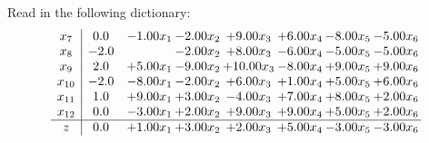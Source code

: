 \documentclass[9pt]{article}
\begin{document}
Read in the following dictionary:
\[\begin{array}{c| c c@{\hskip 2pt} c@{\hskip 2pt} c@{\hskip 2pt} c@{\hskip 2pt} c@{\hskip 2pt} c@{\hskip 2pt} }
 x_{7}   &  0.0 & -1.00 x_{1} & -2.00 x_{2} & +  9.00 x_{3} & +  6.00 x_{4} & -8.00 x_{5} & -5.00 x_{6}\\
 x_{8}   &  -2.0  &   & -2.00 x_{2} & +  8.00 x_{3} & -6.00 x_{4} & -5.00 x_{5} & -5.00 x_{6}\\
 x_{9}   &  2.0 & +  5.00 x_{1} & -9.00 x_{2} & + 10.00 x_{3} & -8.00 x_{4} & +  9.00 x_{5} & +  9.00 x_{6}\\
 x_{10}   &  -2.0 & -8.00 x_{1} & -2.00 x_{2} & +  6.00 x_{3} & +  1.00 x_{4} & +  5.00 x_{5} & +  6.00 x_{6}\\
 x_{11}   &  1.0 & +  9.00 x_{1} & +  3.00 x_{2} & -4.00 x_{3} & +  7.00 x_{4} & +  8.00 x_{5} & +  2.00 x_{6}\\
 x_{12}   &  0.0 & -3.00 x_{1} & +  2.00 x_{2} & +  9.00 x_{3} & +  9.00 x_{4} & +  5.00 x_{5} & +  2.00 x_{6}\\
\hline
z    &  0.0 & +  1.00 x_{1} & +  3.00 x_{2} & +  2.00 x_{3} & +  5.00 x_{4} & -3.00 x_{5} & -3.00 x_{6}\\
\end{array}\]
\end{document}
